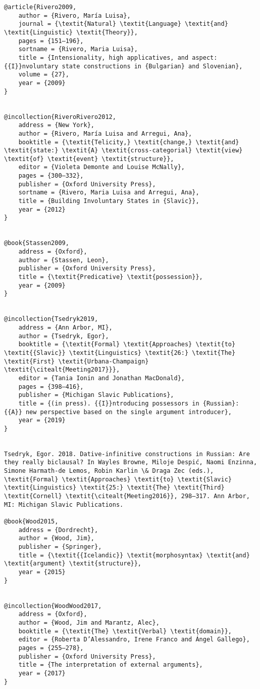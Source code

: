 \documentclass[output=paper,modfonts,nonflat]{langsci/langscibook}
\begin{document}
\begin{verbatim}
@article{Rivero2009,
	author = {Rivero, María Luisa},
	journal = {\textit{Natural} \textit{Language} \textit{and} \textit{Linguistic} \textit{Theory}},
	pages = {151–196},
	sortname = {Rivero, Maria Luisa},
	title = {Intensionality, high applicatives, and aspect: {{I}}nvoluntary state constructions in {Bulgarian} and Slovenian},
	volume = {27},
	year = {2009}
}


@incollection{RiveroRivero2012,
	address = {New York},
	author = {Rivero, María Luisa and Arregui, Ana},
	booktitle = {\textit{Telicity,} \textit{change,} \textit{and} \textit{state:} \textit{A} \textit{cross-categorial} \textit{view} \textit{of} \textit{event} \textit{structure}},
	editor = {Violeta Demonte and Louise McNally},
	pages = {300–332},
	publisher = {Oxford University Press},
	sortname = {Rivero, Maria Luisa and Arregui, Ana},
	title = {Building Involuntary States in {Slavic}},
	year = {2012}
}


@book{Stassen2009,
	address = {Oxford},
	author = {Stassen, Leon},
	publisher = {Oxford University Press},
	title = {\textit{Predicative} \textit{possession}},
	year = {2009}
}


@incollection{Tsedryk2019,
	address = {Ann Arbor, MI},
	author = {Tsedryk, Egor},
	booktitle = {\textit{Formal} \textit{Approaches} \textit{to} \textit{{Slavic}} \textit{Linguistics} \textit{26:} \textit{The} \textit{First} \textit{Urbana-Champaign} \textit{\citealt{Meeting2017}}},
	editor = {Tania Ionin and Jonathan MacDonald},
	pages = {398–416},
	publisher = {Michigan Slavic Publications},
	title = {(in press). {{I}}ntroducing possessors in {Russian}: {{A}} new perspective based on the single argument introducer},
	year = {2019}
}


Tsedryk, Egor. 2018. Dative-infinitive constructions in Russian: Are they really biclausal? In Wayles Browne, Miloje Despić, Naomi Enzinna, Simone Harmath-de Lemos, Robin Karlin \& Draga Zec (eds.), \textit{Formal} \textit{Approaches} \textit{to} \textit{Slavic} \textit{Linguistics} \textit{25:} \textit{The} \textit{Third} \textit{Cornell} \textit{\citealt{Meeting2016}}, 298–317. Ann Arbor, MI: Michigan Slavic Publications.

@book{Wood2015,
	address = {Dordrecht},
	author = {Wood, Jim},
	publisher = {Springer},
	title = {\textit{{Icelandic}} \textit{morphosyntax} \textit{and} \textit{argument} \textit{structure}},
	year = {2015}
}


@incollection{WoodWood2017,
	address = {Oxford},
	author = {Wood, Jim and Marantz, Alec},
	booktitle = {\textit{The} \textit{Verbal} \textit{domain}},
	editor = {Roberta D’Alessandro, Irene Franco and Ángel Gallego},
	pages = {255–278},
	publisher = {Oxford University Press},
	title = {The interpretation of external arguments},
	year = {2017}
}


\end{verbatim}
\sloppy\printbibliography[heading=subbibliography,notkeyword=this]
\end{document}
